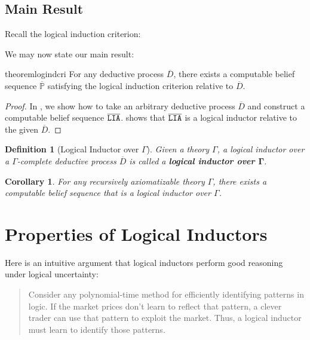 \documentclass[authordate,onecolumn,noenvironments]{miri-tech-article}
\newtheorem{definition}[theorem]{Definition}
\newenvironment{key}{\begin{mdframed}[innertopmargin=-.3\baselineskip]}{\end{mdframed}}
\numberwithin{equation}{subsection}
\newtheorem{corollary}[theorem]{Corollary}
\newcommand{\seq}[1]{{\overline{#1}}}
\newcommand{\li}{logical inductor}
\newcommand{\LItitle}{Logical Inductor}
\newcommand{\lic}{logical induction criterion}
\newcommand{\LIA}{\text{\upshape{\texttt{LIA}}}\xspace}
\newcommand{\BelState}{\mathbb{P}}
\newcommand{\pt}{\BelState}
\newcommand{\MP}{\seq{\pt}}
\newcommand{\dt}{D}
\newcommand{\DP}{\seq{\dt}}
\newcommand{\Theory}{\Gamma}
\begin{document}
\subsection{Main Result}\label{sec:mainthm}

Recall the \lic{}:

\criterion*

\noindent We may now state our main result:

\begin{key}
\begin{restatable}{theorem}{logindcri}\label{thm:li}
  For any deductive process $\DP$, there exists a computable belief sequence $\MP$ satisfying the \lic{} relative to $\DP$.
\end{restatable}
\end{key}

\begin{proof}
  In , we show how to take an arbitrary deductive process $\DP$ and construct a computable belief sequence $\seq\LIA$.  shows that $\seq\LIA$ is a logical inductor relative to the given $\DP$.
\end{proof}

\begin{definition}[Logical Inductor over $\Theory$]
  Given a theory $\Theory$, a \li{} over a $\Theory$-complete deductive process $\DP$ is called a \textbf{\li{} over $\boldsymbol\Theory$}.
\end{definition}

\begin{corollary}
  For any recursively axiomatizable theory $\Theory$, there exists a computable belief sequence that is a logical inductor over $\Theory$.
\end{corollary}

%
%
%
%
%
%
%
%
%
%
%
%
%
%
%
%
%

\section{Properties of \LItitle{}s}\label{sec:properties}
Here is an intuitive argument that logical inductors perform good reasoning under logical uncertainty:

\begin{quote}
  Consider any polynomial-time method for efficiently identifying patterns in logic. If the market prices don't learn to reflect that pattern, a clever trader can use that pattern to exploit the market. Thus, a logical inductor must learn to identify those patterns.
\end{quote}
\end{document}
